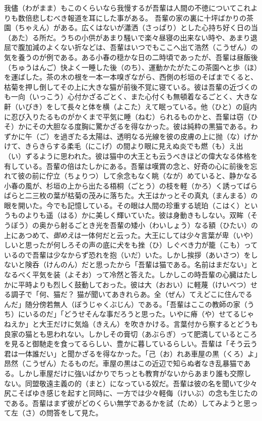 \documentclass{book}
\begin{document}
我儘（わがまま）もこのくらいなら我慢するが吾輩は人間の不徳についてこれよりも数倍悲しむべき報道を耳にした事がある。
吾輩の家の裏に十坪ばかりの茶園（ちゃえん）がある。広くはないが瀟洒（さっぱり）とした心持ち好く日の当（あた）る所だ。うちの小供があまり騒いで楽々昼寝の出来ない時や、あまり退屈で腹加減のよくない折などは、吾輩はいつでもここへ出て浩然（こうぜん）の気を養うのが例である。ある小春の穏かな日の二時頃であったが、吾輩は昼飯後（ちゅうはんご）快よく一睡した後（のち）、運動かたがたこの茶園へと歩（ほ）を運ばした。茶の木の根を一本一本嗅ぎながら、西側の杉垣のそばまでくると、枯菊を押し倒してその上に大きな猫が前後不覚に寝ている。彼は吾輩の近づくのも一向（いっこう）心付かざるごとく、また心付くも無頓着なるごとく、大きな鼾（いびき）をして長々と体を横（よこた）えて眠っている。他（ひと）の庭内に忍び入りたるものがかくまで平気に睡（ねむ）られるものかと、吾輩は窃（ひそ）かにその大胆なる度胸に驚かざるを得なかった。彼は純粋の黒猫である。わずかに午（ご）を過ぎたる太陽は、透明なる光線を彼の皮膚の上に抛（な）げかけて、きらきらする柔毛（にこげ）の間より眼に見えぬ炎でも燃（も）え出（い）ずるように思われた。彼は猫中の大王とも云うべきほどの偉大なる体格を有している。吾輩の倍はたしかにある。吾輩は嘆賞の念と、好奇の心に前後を忘れて彼の前に佇立（ちょりつ）して余念もなく眺（なが）めていると、静かなる小春の風が、杉垣の上から出たる梧桐（ごとう）の枝を軽（かろ）く誘ってばらばらと二三枚の葉が枯菊の茂みに落ちた。大王はかっとその真丸（まんまる）の眼を開いた。今でも記憶している。その眼は人間の珍重する琥珀（こはく）というものよりも遥（はる）かに美しく輝いていた。彼は身動きもしない。双眸（そうぼう）の奥から射るごとき光を吾輩の矮小（わいしょう）なる額（ひたい）の上にあつめて、\emph{御めえ}は一体何だと云った。大王にしては少々言葉が卑（いや）しいと思ったが何しろその声の底に犬をも挫（ひ）しぐべき力が籠（こも）っているので吾輩は少なからず恐れを抱（いだ）いた。しかし挨拶（あいさつ）をしないと険呑（けんのん）だと思ったから「吾輩は猫である。名前はまだない」となるべく平気を装（よそお）って冷然と答えた。しかしこの時吾輩の心臓はたしかに平時よりも烈しく鼓動しておった。彼は大（おおい）に軽蔑（けいべつ）せる調子で「何、猫だ？ 猫が聞いてあきれらあ。全（ぜん）てえどこに住んでるんだ」随分傍若無人（ぼうじゃくぶじん）である。「吾輩はここの教師の家（うち）にいるのだ」「どうせそんな事だろうと思った。いやに瘠（や）せてるじゃねえか」と大王だけに気焔（きえん）を吹きかける。言葉付から察するとどうも良家の猫とも思われない。しかしその膏切（あぶらぎ）って肥満しているところを見ると御馳走を食ってるらしい、豊かに暮しているらしい。吾輩は「そう云う君は一体誰だい」と聞かざるを得なかった。「己（お）れあ車屋の黒（くろ）よ」昂然（こうぜん）たるものだ。車屋の黒はこの近辺で知らぬ者なき乱暴猫である。しかし車屋だけに強いばかりでちっとも教育がないからあまり誰も交際しない。同盟敬遠主義の的（まと）になっている奴だ。吾輩は彼の名を聞いて少々尻こそばゆき感じを起すと同時に、一方では少々軽侮（けいぶ）の念も生じたのである。吾輩はまず彼がどのくらい無学であるかを試（ため）してみようと思って左（さ）の問答をして見た。
\end{document}
